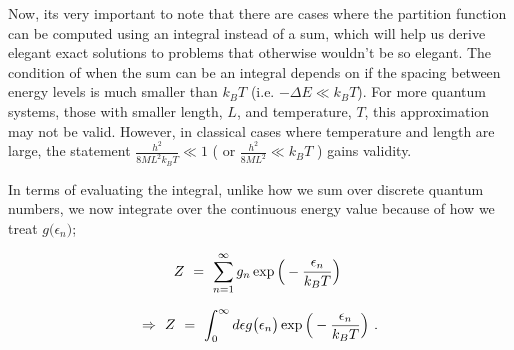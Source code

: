 \documentclass{article}
\begin{document}
Now, its very important to note that there are cases where the partition function can be computed using an integral instead of a sum, which will help us derive elegant exact solutions to problems that otherwise wouldn't be so elegant. The condition of when the sum can be an integral depends on if the spacing between energy levels is much smaller than \begin{math} k_B T \end{math} (i.e. \begin{math} - \Delta E \ll k_B T \end{math}). For more quantum systems, those with smaller length, \begin{math} L \end{math}, and temperature, \begin{math} T \end{math}, this approximation may not be valid. However, in classical cases where temperature and length are large, the statement \begin{math} \frac{h^2}{8 M L^2 k_B T} \ll 1 \end{math} ( or \begin{math} \frac{h^2}{8 M L^2} \ll k_B T \end{math} ) gains validity.

In terms of evaluating the integral, unlike how we sum over discrete quantum numbers, we now integrate over the continuous energy value because of how we treat \begin{math} g \big( \epsilon_{n} \big) \end{math};

\begin{equation} \label{eb-eq-256-77}
Z \hspace{0.125cm} = \hspace{0.125cm} \sum_{n = 1}^{\infty}  g_{n} \exp{\Big(-\frac{\epsilon_{n}}{k_B T} \Big)} \hspace{0.125cm} 
\end{equation}

\begin{equation} \label{eb-eq-256-78}
\Rightarrow \hspace{0.125cm} Z \hspace{0.125cm} = \hspace{0.125cm} \int_{0}^{\infty} d \epsilon g \big( \epsilon_n \big) \exp{\Big(-\frac{\epsilon_{n}}{k_B T} \Big)} \hspace{0.125cm} .
\end{equation}
\end{document}
